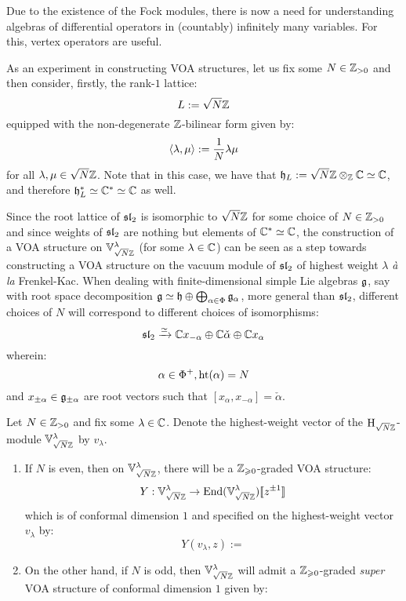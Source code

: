             Due to the existence of the Fock modules, there is now a need for understanding algebras of differential operators in (countably) infinitely many variables. For this, vertex operators are useful.

            As an experiment in constructing VOA structures, let us fix some $N \in \Z_{> 0}$ and then consider, firstly, the rank-$1$ lattice:
                $$L := \sqrt{N} \Z$$
            equipped with the non-degenerate $\Z$-bilinear form given by:
                $$\<\lambda, \mu\> := \frac1N \lambda \mu$$
            for all $\lambda, \mu \in \sqrt{N} \Z$. Note that in this case, we have that $\h_L := \sqrt{N}\Z \tensor_{\Z} \bbC \cong \bbC$, and therefore $\h_L^* \cong \bbC^* \cong \bbC$ as well.
            \begin{remark}
                Since the root lattice of $\sl_2$ is isomorphic to $\sqrt{N} \Z$ for some choice of $N \in \Z_{> 0}$ and since weights of $\sl_2$ are nothing but elements of $\bbC^* \cong \bbC$, the construction of a VOA structure on $\V_{\sqrt{N} \Z}^{\lambda}$ (for some $\lambda \in \bbC$) can be seen as a step towards constructing a VOA structure on the vacuum module of $\sl_2$ of highest weight $\lambda$ \textit{\`a la} Frenkel-Kac. When dealing with finite-dimensional simple Lie algebras $\g$, say with root space decomposition $\g \cong \h \oplus \bigoplus_{\alpha \in \Phi} \g_{\alpha}$, more general than $\sl_2$, different choices of $N$ will correspond to different choices of isomorphisms:
                    $$\sl_2 \xrightarrow[]{\cong} \bbC x_{-\alpha} \oplus \bbC \check{\alpha} \oplus \bbC x_{\alpha}$$
                wherein:
                    $$\alpha \in \Phi^+, \height(\alpha) = N$$
                and $x_{\pm \alpha} \in \g_{\pm \alpha}$ are root vectors such that $[x_{\alpha}, x_{-\alpha}] = \check{\alpha}$.
            \end{remark}
            \begin{proposition} \label{prop: rank_1_lattice_(super)_VOAs}
                Let $N \in \Z_{> 0}$ and fix some $\lambda \in \bbC$. Denote the highest-weight vector of the $\rmH_{\sqrt{N} \Z}$-module $\V_{\sqrt{N} \Z}^{\lambda}$ by $v_{\lambda}$.
                \begin{enumerate}
                    \item If $N$ is even, then on $\V_{\sqrt{N} \Z}^{\lambda}$, there will be a $\Z_{\geq 0}$-graded VOA structure:
                        $$Y: \V_{\sqrt{N} \Z}^{\lambda} \to \End(\V_{\sqrt{N} \Z}^{\lambda})[\![z^{\pm 1}]\!]$$
                    which is of conformal dimension $1$ and specified on the highest-weight vector $v_{\lambda}$ by:
                        $$Y(v_{\lambda}, z) := $$
                    \item On the other hand, if $N$ is odd, then $\V_{\sqrt{N} \Z}^{\lambda}$ will admit a $\Z_{\geq 0}$-graded \textit{super} VOA structure of conformal dimension $1$ given by:
                \end{enumerate}
            \end{proposition}

